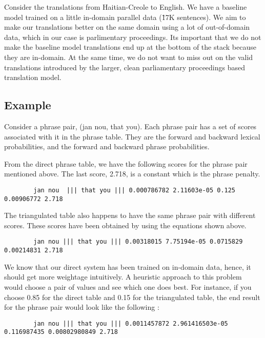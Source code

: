 	Consider the translations from Haitian-Creole to English. We have a baseline model trained on a little in-domain parallel data (\~17K sentences). We aim to make our translations better on the same domain using a lot of out-of-domain data, which in our case is parlimentary proceedings. Its important that we do not make the baseline model translations end up at the bottom of the stack because they are in-domain. At the same time, we do not want to miss out on the valid translations introduced by the larger, clean parliamentary proceedings based translation model. 

	\subsection{Example}
		Consider a phrase pair, (jan nou, that you). Each phrase pair has a set of scores associated with it in the phrase table. They are the forward and backward lexical probabilities, and the forward and backward phrase probabilities. 

		From the direct phrase table, we have the following scores for the phrase pair mentioned above. The last score, 2.718, is a constant which is the phrase penalty. 
	\begin{verbatim}
		jan nou  ||| that you ||| 0.000786782 2.11603e-05 0.125 0.00906772 2.718 
	\end{verbatim}

		The triangulated table also happens to have the same phrase pair with different scores. These scores have been obtained by using the equations shown above.
	\begin{verbatim}
		jan nou ||| that you ||| 0.00318015 7.75194e-05 0.0715829 0.00214831 2.718
	\end{verbatim}

		We know that our direct system has been trained on in-domain data, hence, it should get more weightage intuitively. A heuristic approach to this problem would choose a pair of values and see which one does best. For instance, if you choose 0.85 for the direct table and 0.15 for the triangulated table, the end result for the phrase pair would look like the following : 

	\begin{verbatim}
		jan nou ||| that you ||| 0.0011457872 2.961416503e-05 0.116987435 0.00802980849 2.718	
	\end{verbatim}


